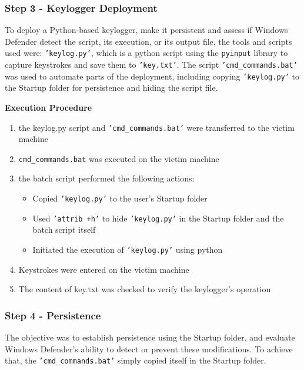 \documentclass[11pt]{article}
\begin{document}
				\subsubsection{Step 3 - Keylogger Deployment}
					To deploy a Python-based keylogger, make it persistent and assess if Windows Defender detect the script, its execution, or its output file, the tools and scripts used were: \texttt{'keylog.py'}, which is a python script using the \texttt{pyinput} library to capture keystrokes and save them to \texttt{'key.txt'}. The script \texttt{'cmd\_commands.bat'} was used to automate parts of the deployment, including copying \texttt{'keylog.py'} to the Startup folder for persistence and hiding the script file.\\\par
					
					\textbf{Execution Procedure}
						\begin{enumerate}
							\item the keylog.py script and \texttt{'cmd\_commands.bat'} were transferred to the victim machine
							\item \texttt{cmd\_commands.bat} was executed on the victim machine
							\item the batch script performed the following actions:
							\begin{itemize}
								\item Copied \texttt{'keylog.py'} to the user's Startup folder
								\item Used \texttt{'attrib +h'} to hide \texttt{'keylog.py'} in the Startup folder and the batch script itself
								\item Initiated the execution of \texttt{'keylog.py'} using python
							\end{itemize}
							\item Keystrokes were entered on the victim machine
							\item The content of key.txt was checked to verify the keylogger's operation
						\end{enumerate}
			
				\subsubsection{Step 4 - Persistence}
					The objective was to establish persistence using the Startup folder, and evaluate Windows Defender's ability to detect or prevent these modifications. To achieve that, the \texttt{'cmd\_commands.bat'} simply copied itself in the Startup folder.
				
\end{document}
